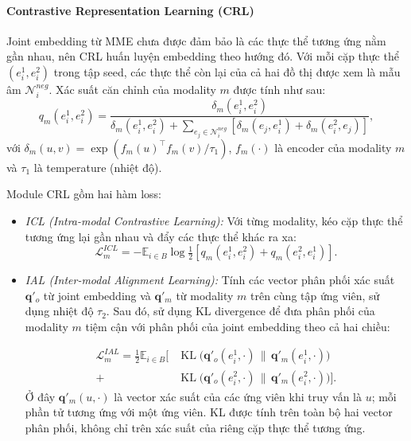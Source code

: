 \paragraph{Contrastive Representation Learning (CRL)}

Joint embedding từ MME chưa được đảm bảo là các thực thể tương ứng nằm gần nhau, nên CRL huấn luyện embedding theo hướng đó. Với mỗi cặp thực thể $(e^1_i, e^2_i)$ trong tập seed, các thực thể còn lại của cả hai đồ thị được xem là mẫu âm $\mathcal{N}^{neg}_i$. Xác suất căn chỉnh của modality $m$ được tính như sau:
\[
    q_m(e^1_i, e^2_i)
    = \frac{\delta_m(e^1_i, e^2_i)}
    {\delta_m(e^1_i, e^2_i)
    + \sum_{e_j \in \mathcal{N}^{neg}_i}
    \left[\delta_m(e_j, e^1_i) + \delta_m(e^2_i, e_j)\right]},
\]
với $\delta_m(u,v) = \exp\!\left(f_m(u)^\top f_m(v) / \tau_1\right)$, $f_m(\cdot)$ là encoder của modality $m$ và $\tau_1$ là temperature (nhiệt độ).

Module CRL gồm hai hàm loss:
\begin{itemize}
    \item \textit{ICL (Intra-modal Contrastive Learning):} Với từng modality, kéo cặp thực thể tương ứng lại gần nhau và đẩy các thực thể khác ra xa:
    \[
        \mathcal{L}^{ICL}_m = -\mathbb{E}_{i \in B}\log
        \tfrac{1}{2}\left[q_m(e^1_i, e^2_i) + q_m(e^2_i, e^1_i)\right].
    \]
  \item \textit{IAL (Inter-modal Alignment Learning):} Tính các vector phân phối xác suất $\mathbf{q}'_o$ từ joint embedding và $\mathbf{q}'_m$ từ modality $m$ trên cùng tập ứng viên, sử dụng nhiệt độ $\tau_2$. Sau đó, sử dụng KL divergence để đưa phân phối của modality $m$ tiệm cận với phân phối của joint embedding theo cả hai chiều:

    \begin{equation}
        \begin{aligned}
        \mathcal{L}^{IAL}_m
        = \frac{1}{2}\mathbb{E}_{i \in B}\Big[
        &\operatorname{KL}\big(
        \mathbf{q}'_o(e^1_i,\cdot)
        \,\|\, \mathbf{q}'_m(e^1_i,\cdot)
        \big)\\
        +&\operatorname{KL}\big(
        \mathbf{q}'_o(e^2_i,\cdot)
        \,\|\, \mathbf{q}'_m(e^2_i,\cdot)
        \big)
        \Big].
        \end{aligned}
    \end{equation}
    Ở đây $\mathbf{q}'_m(u,\cdot)$ là vector xác suất của các
    ứng viên khi truy vấn là $u$; mỗi phần tử tương ứng với một
    ứng viên. KL được tính trên toàn bộ hai vector phân phối,
    không chỉ trên xác suất của riêng cặp thực thể tương ứng.

\end{itemize}

